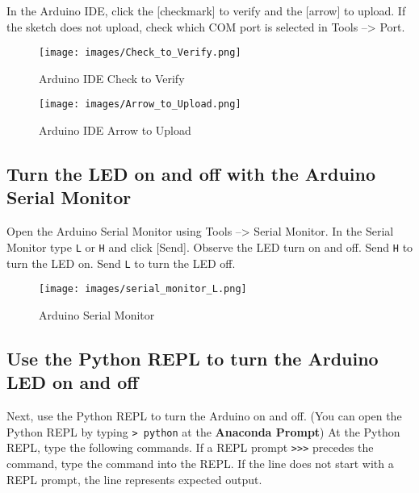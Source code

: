 \documentclass{book}
\makeatletter
\def\maxwidth{\ifdim\Gin@nat@width>\linewidth\linewidth
\else\Gin@nat@width\fi}
\let\Oldincludegraphics\includegraphics
\renewcommand{\includegraphics}[1]{\Oldincludegraphics[width=.8\maxwidth]{#1}}
\newcommand{\passthrough}[1]{#1}
\makeatother
\begin{document}
In the Arduino IDE, click the {[}checkmark{]} to verify and the
{[}arrow{]} to upload. If the sketch does not upload, check which COM
port is selected in Tools --\textgreater{} Port.

\begin{figure}
\centering
\texttt{[image: images/Check\_to\_Verify.png]}
\caption{Arduino IDE Check to Verify}
\end{figure}

\begin{figure}
\centering
\texttt{[image: images/Arrow\_to\_Upload.png]}
\caption{Arduino IDE Arrow to Upload}
\end{figure}
    




    
        \hypertarget{turn-the-led-on-and-off-with-the-arduino-serial-monitor}{%
\subsection{Turn the LED on and off with the Arduino Serial
Monitor}\label{turn-the-led-on-and-off-with-the-arduino-serial-monitor}}
    




    
        Open the Arduino Serial Monitor using Tools --\textgreater{} Serial
Monitor. In the Serial Monitor type \passthrough{\lstinline!L!} or
\passthrough{\lstinline!H!} and click {[}Send{]}. Observe the LED turn
on and off. Send \passthrough{\lstinline!H!} to turn the LED on. Send
\passthrough{\lstinline!L!} to turn the LED off.

\begin{figure}
\centering
\texttt{[image: images/serial\_monitor\_L.png]}
\caption{Arduino Serial Monitor}
\end{figure}
    




    
        \hypertarget{use-the-python-repl-to-turn-the-arduino-led-on-and-off}{%
\subsection{Use the Python REPL to turn the Arduino LED on and
off}\label{use-the-python-repl-to-turn-the-arduino-led-on-and-off}}
    




    
        Next, use the Python REPL to turn the Arduino on and off. (You can open
the Python REPL by typing \passthrough{\lstinline!> python!} at the
\textbf{Anaconda Prompt}) At the Python REPL, type the following
commands. If a REPL prompt \passthrough{\lstinline!>>>!} precedes the
command, type the command into the REPL. If the line does not start with
a REPL prompt, the line represents expected output.
\end{document}
